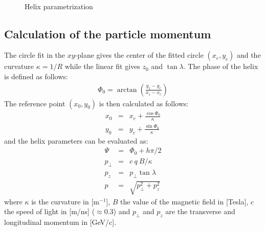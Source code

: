 \documentclass[twoside]{article}
\begin{document}
\begin{figure}[thb]
\mbox{
  \quad
  }
  \caption{Helix parametrization}
  \label{fig:helix}
\end{figure}

\subsection{Calculation of the particle momentum}

The circle fit in the $xy$-plane gives the center of the fitted circle $(x_c, y_c)$
and the curvature $\kappa = 1/R$ while the linear fit gives $z_0$ and $\tan \lambda$.
The phase of the helix is defined as follows:
\begin{eqnarray}
  \Phi_0 = \arctan \left( \frac{y_1 - y_c}{x_1 - x_c} \right)
\end{eqnarray}
The reference point $(x_0, y_0)$ is then calculated as follows:
\begin{eqnarray}
  x_0 & = & x_c + \frac{\cos \Phi_0}{\kappa} \\
  y_0 & = & y_c + \frac{\sin \Phi_0}{\kappa}
\end{eqnarray}
and the helix parameters can be evaluated as:
\begin{eqnarray}
  \Psi & = & \Phi_0 + h \pi / 2 \\
  p_\perp & = & c\ q\ B / \kappa \\
  p_z & = & p_\perp \tan \lambda \\
  p & = & \sqrt{p^2_\perp + p^2_z}
\end{eqnarray}
where $\kappa$ is the curvature in [m$^{-1}$], $B$ the value of the
magnetic field in [Tesla], $c$ the speed of light in [m/ns] ($\approx
0.3$) and $p_\perp$ and $p_z$ are the transverse and longitudinal
momentum in [GeV/c].
\end{document}

